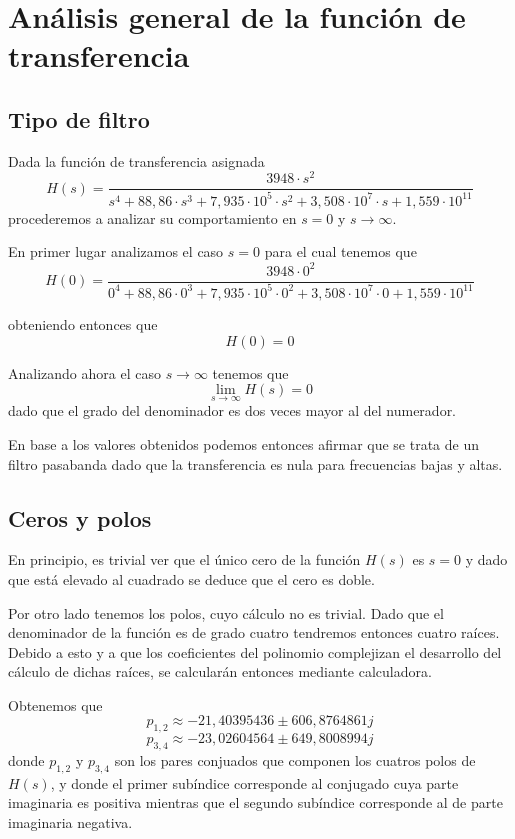 \documentclass[11pt,a4paper]{report}
\author{Marcos Rolando}
\begin{document}


\section*{Análisis general de la función de transferencia}

\subsection*{Tipo de filtro}

Dada la función de transferencia asignada
\[H(s)=\frac{3948 \cdot s^2}{s^4+88,86 \cdot s^3+7,935 \cdot 10^5 \cdot s^2+3,508 \cdot 10^7 \cdot s+1,559 \cdot 10^{11}}\]
procederemos a analizar su comportamiento en $s=0$ y $s\longrightarrow\infty$.

\bigskip
En primer lugar analizamos el caso $s=0$ para el cual tenemos que 
\[H(0) = \frac{3948 \cdot 0^2}{0^4+88,86 \cdot 0^3+7,935 \cdot 10^5 \cdot 0^2+3,508 \cdot 10^7 \cdot 0+1,559 \cdot 10^{11}}\]

obteniendo entonces que
\[H(0) = 0\]

Analizando ahora el caso $s\longrightarrow\infty$ tenemos que
\[\lim_{s \to \infty} H(s) = 0\]
dado que el grado del denominador es dos veces mayor al del numerador.

\bigskip
En base a los valores obtenidos podemos entonces afirmar que se trata de un
filtro pasabanda dado que la transferencia es nula para frecuencias bajas y altas.

\subsection*{Ceros y polos}

En principio, es trivial ver que el único cero de la función $H(s)$ es
$s = 0$ y dado que está elevado al cuadrado se deduce que el cero es doble.

\bigskip
Por otro lado tenemos los polos, cuyo cálculo no es trivial. Dado que el denominador de la función es de grado cuatro tendremos entonces cuatro raíces. Debido a esto
y a que los coeficientes del polinomio complejizan el desarrollo del cálculo de 
dichas raíces, se calcularán entonces mediante calculadora. 

\bigskip
Obtenemos que
\[p_{1,2} \approx -21,40395436 \pm 606,8764861j\]
\[p_{3,4} \approx -23,02604564 \pm 649,8008994j\]
donde $p_{1,2}$ y $p_{3,4}$ son los pares conjuados que componen los cuatros
polos de $H(s)$, y donde el primer subíndice corresponde al conjugado cuya parte imaginaria es positiva mientras que el segundo subíndice corresponde al de parte imaginaria negativa.
\end{document}
